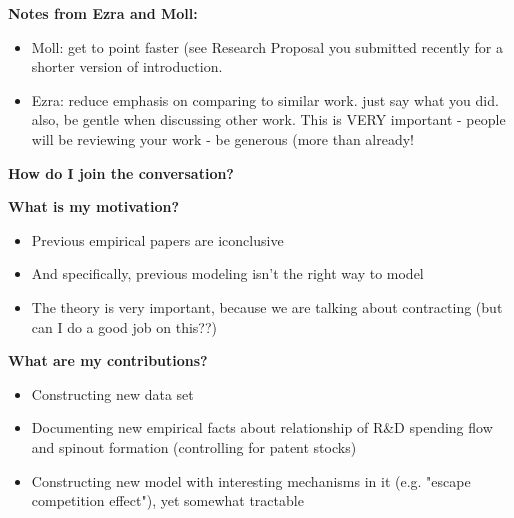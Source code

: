\documentclass[11pt,english]{article}
\theoremstyle{remark}
\begin{document}
\begin{abstract}
\end{abstract}

\textbf{Notes from Ezra and Moll:}

\begin{itemize}
	\item Moll: get to point faster (see Research Proposal you submitted recently for a shorter version of introduction.
	\item Ezra: reduce emphasis on comparing to similar work. just say what you did. also, be gentle when discussing other work. This is VERY important - people will be reviewing your work - be generous (more than already!
\end{itemize}

\textbf{How do I join the conversation?}

\textbf{What is my motivation?}

\begin{itemize}
	\item Previous empirical papers are iconclusive
	\item And specifically, previous modeling isn't the right way to model 
	\item The theory is very important, because we are talking about contracting (but can I do a good job on this??)
\end{itemize}

\textbf{What are my contributions?}

\begin{itemize}
	\item Constructing new data set
	\item Documenting new empirical facts about relationship of R\&D spending flow and spinout formation (controlling for patent stocks)
	\item Constructing new model with interesting mechanisms in it (e.g. "escape competition effect"), yet somewhat tractable
\end{itemize}
\end{document}
